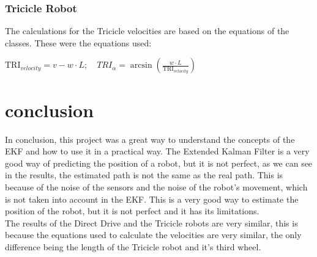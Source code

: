 \documentclass[runningheads]{llncs}
\begin{document}
\subsubsection*{Tricicle Robot}
The calculations for the Tricicle velocities are based on the equations of the classes. These were the equations used:

\begin{center}
    
\begin{math}
    \text{TRI}_{velocity} = v - w \cdot L ;\quad
    TRI_{\alpha} = \arcsin(\frac{w \cdot L}{  \text{TRI}_{velocity}})
\end{math}
\end{center}


\section{conclusion}



In conclusion, this project was a great way to understand the concepts of the EKF and how to use it in a practical way. 
The Extended Kalman Filter is a very good way of predicting the position of a robot, but it is not perfect, as we can see in the results, the estimated path is not the same as the real path. This is because of the noise of the sensors and the noise of the robot's movement, which is not taken into account in the EKF.
This is a very good way to estimate the position of the robot, but it is not perfect and it has its limitations.
\\The results of the Direct Drive and the Tricicle robots are very similar, this is because the equations used to calculate the velocities are very similar, the only difference being the length of the Tricicle robot and it's  third wheel. 
\end{document}
